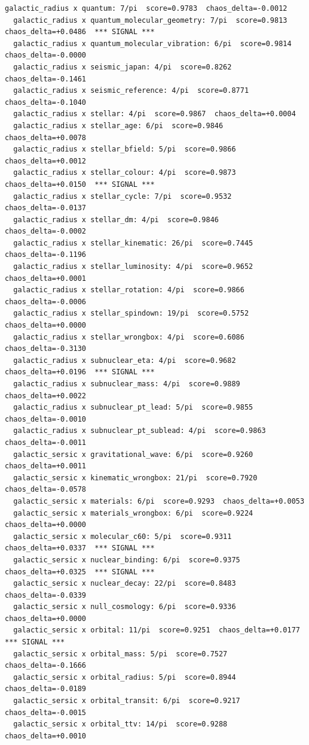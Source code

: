 \documentclass[11pt, letterpaper, openany]{book}
\begin{document}
\begin{empiricalbox}
\begin{lstlisting}[style=terminal]
  galactic_radius x quantum: 7/pi  score=0.9783  chaos_delta=-0.0012
  galactic_radius x quantum_molecular_geometry: 7/pi  score=0.9813  chaos_delta=+0.0486  *** SIGNAL ***
  galactic_radius x quantum_molecular_vibration: 6/pi  score=0.9814  chaos_delta=-0.0000
  galactic_radius x seismic_japan: 4/pi  score=0.8262  chaos_delta=-0.1461
  galactic_radius x seismic_reference: 4/pi  score=0.8771  chaos_delta=-0.1040
  galactic_radius x stellar: 4/pi  score=0.9867  chaos_delta=+0.0004
  galactic_radius x stellar_age: 6/pi  score=0.9846  chaos_delta=+0.0078
  galactic_radius x stellar_bfield: 5/pi  score=0.9866  chaos_delta=+0.0012
  galactic_radius x stellar_colour: 4/pi  score=0.9873  chaos_delta=+0.0150  *** SIGNAL ***
  galactic_radius x stellar_cycle: 7/pi  score=0.9532  chaos_delta=-0.0137
  galactic_radius x stellar_dm: 4/pi  score=0.9846  chaos_delta=-0.0002
  galactic_radius x stellar_kinematic: 26/pi  score=0.7445  chaos_delta=-0.1196
  galactic_radius x stellar_luminosity: 4/pi  score=0.9652  chaos_delta=+0.0001
  galactic_radius x stellar_rotation: 4/pi  score=0.9866  chaos_delta=-0.0006
  galactic_radius x stellar_spindown: 19/pi  score=0.5752  chaos_delta=+0.0000
  galactic_radius x stellar_wrongbox: 4/pi  score=0.6086  chaos_delta=-0.3130
  galactic_radius x subnuclear_eta: 4/pi  score=0.9682  chaos_delta=+0.0196  *** SIGNAL ***
  galactic_radius x subnuclear_mass: 4/pi  score=0.9889  chaos_delta=+0.0022
  galactic_radius x subnuclear_pt_lead: 5/pi  score=0.9855  chaos_delta=-0.0010
  galactic_radius x subnuclear_pt_sublead: 4/pi  score=0.9863  chaos_delta=-0.0011
  galactic_sersic x gravitational_wave: 6/pi  score=0.9260  chaos_delta=+0.0011
  galactic_sersic x kinematic_wrongbox: 21/pi  score=0.7920  chaos_delta=-0.0578
  galactic_sersic x materials: 6/pi  score=0.9293  chaos_delta=+0.0053
  galactic_sersic x materials_wrongbox: 6/pi  score=0.9224  chaos_delta=+0.0000
  galactic_sersic x molecular_c60: 5/pi  score=0.9311  chaos_delta=+0.0337  *** SIGNAL ***
  galactic_sersic x nuclear_binding: 6/pi  score=0.9375  chaos_delta=+0.0325  *** SIGNAL ***
  galactic_sersic x nuclear_decay: 22/pi  score=0.8483  chaos_delta=-0.0339
  galactic_sersic x null_cosmology: 6/pi  score=0.9336  chaos_delta=+0.0000
  galactic_sersic x orbital: 11/pi  score=0.9251  chaos_delta=+0.0177  *** SIGNAL ***
  galactic_sersic x orbital_mass: 5/pi  score=0.7527  chaos_delta=-0.1666
  galactic_sersic x orbital_radius: 5/pi  score=0.8944  chaos_delta=-0.0189
  galactic_sersic x orbital_transit: 6/pi  score=0.9217  chaos_delta=-0.0015
  galactic_sersic x orbital_ttv: 14/pi  score=0.9288  chaos_delta=+0.0010

\end{lstlisting}
\end{empiricalbox}
\end{document}

